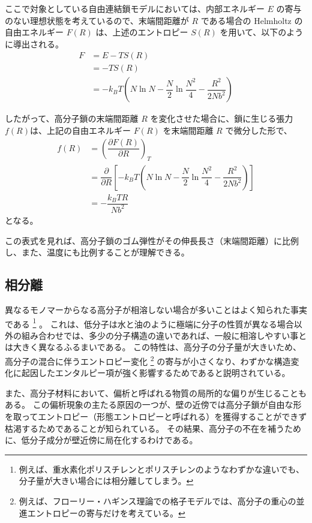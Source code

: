 \documentclass[a4paper,11pt]{ltjsarticle}
\begin{document}
ここで対象としている自由連結鎖モデルにおいては、内部エネルギー $E$ の寄与のない理想状態を考えているので、末端間距離が $R$ である場合の Helmholtz の自由エネルギー $F(R)$ は、上述のエントロピー $S(R)$ を用いて、以下のように導出される。
\begin{align*}
F 	&= E - TS(R) \\
	&= -TS(R) \\
	&= -k_B T \left( N\ln N - \dfrac{N}{2} \ln \dfrac{N^2}{4} - \dfrac{R^2}{2Nb^2} \right) 
\end{align*}

したがって、高分子鎖の末端間距離 $R$ を変化させた場合に、鎖に生じる張力 $f(R)$は、上記の自由エネルギー $F(R)$ を末端間距離 $R$ で微分した形で、
\begin{align*}
f(R) 	
&= \left(\dfrac{\partial F(R)}{\partial R} \right)_T \\
	&=\dfrac{\partial}{\partial R} \left[ -k_B T \left( N\ln N - \dfrac{N}{2} \ln \dfrac{N^2}{4} - \dfrac{R^2}{2Nb^2} \right) \right]\\
	&=- \dfrac{k_B T R}{Nb^2}
\end{align*}
となる。

この表式を見れば、高分子鎖のゴム弾性がその伸長長さ（末端間距離）に比例し、また、温度にも比例することが理解できる。


\subsection{相分離}

異なるモノマーからなる高分子が相溶しない場合が多いことはよく知られた事実である
\footnote{
例えば、重水素化ポリスチレンとポリスチレンのようなわずかな違いでも、分子量が大きい場合には相分離してしまう。
}
。
これは、低分子は水と油のように極端に分子の性質が異なる場合以外の組み合わせでは、多少の分子構造の違いであれば、一般に相溶しやすい事とは大きく異なるふるまいである。
この特性は、高分子の分子量が大きいため、高分子の混合に伴うエントロピー変化
\footnote
{
例えば、フローリー・ハギンス理論での格子モデルでは、高分子の重心の並進エントロピーの寄与だけを考えている。
}
の寄与が小さくなり、わずかな構造変化に起因したエンタルピー項が強く影響するためであると説明されている。


また、高分子材料において、偏析と呼ばれる物質の局所的な偏りが生じることもある。
この偏析現象の主たる原因の一つが、壁の近傍では高分子鎖が自由な形を取ってエントロピー（形態エントロピーと呼ばれる）を獲得することができず枯渇するためであることが知られている。
その結果、高分子の不在を補うために、低分子成分が壁近傍に局在化するわけである。
\end{document}
